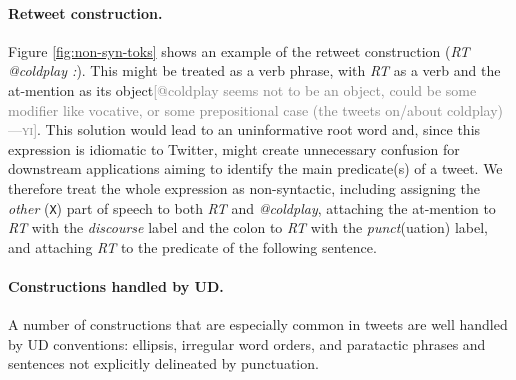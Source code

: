\documentclass[11pt,a4paper]{article}
\newcommand{\yjcomment}[1]{\textcolor{orange}{[$_\mathrm{L}^\mathrm{Y}$#1]}}
\newcommand{\nascomment}[1]{\textcolor{blue}{[#1 ---\textsc{nas}]}}
\newcommand{\yicomment}[1]{\textcolor{gray}{[#1 ---\textsc{yi}]}}
\begin{document}
\paragraph{Retweet construction.} Figure \ref{fig:non-syn-toks} shows
an example of the retweet construction (\emph{RT @coldplay :}).  This
might be treated as a verb phrase, with \emph{RT} as a verb and the
at-mention as its object\yicomment{@coldplay seems not to be an object, could be some modifier like vocative, or some prepositional case (the tweets on/about coldplay)}.
  This solution would lead to an uninformative root
word and, since this expression is idiomatic to Twitter, might create
unnecessary confusion for downstream applications aiming to identify
the main predicate(s) of a tweet.  We therefore treat the whole
expression as non-syntactic, including assigning the \emph{other}
(\texttt{X}) part of speech to both \emph{RT} and \emph{@coldplay},
attaching the at-mention to \emph{RT} with the \emph{discourse}
label and the colon to \emph{RT} with the \emph{punct}(uation) label,
and attaching \emph{RT} to the predicate of the following sentence.



\paragraph{Constructions handled by UD.}  A number of constructions
that are especially common in tweets are well handled by UD
conventions: ellipsis, irregular word orders, and paratactic phrases
and sentences 
not explicitly delineated by punctuation.
	
\end{document}
